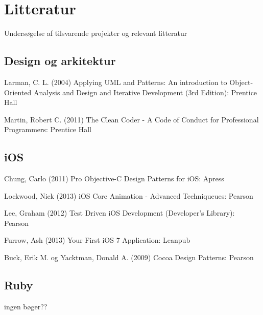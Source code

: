 \chapter{Litteratur}
Undersøgelse af tilsvarende projekter og relevant litteratur

\section{Design og arkitektur}
Larman, C. L. (2004) Applying UML and Patterns: An introduction to Object-Oriented Analysis and Design and Iterative Development (3rd Edition): Prentice Hall

Martin, Robert C. (2011) The Clean Coder - A Code of Conduct for Professional Programmers: Prentice Hall

\section{iOS}
Chung, Carlo (2011) Pro Objective-C Design Patterns for iOS: Apress

Lockwood, Nick (2013) iOS Core Animation - Advanced Techniqueues: Pearson

Lee, Graham (2012) Test Driven iOS Development (Developer’s Library): Pearson

Furrow, Ash (2013) Your First iOS 7 Application: Leanpub

Buck, Erik M. og Yacktman, Donald A. (2009) Cocoa Design Patterns: Pearson

\section{Ruby}
ingen bøger??
